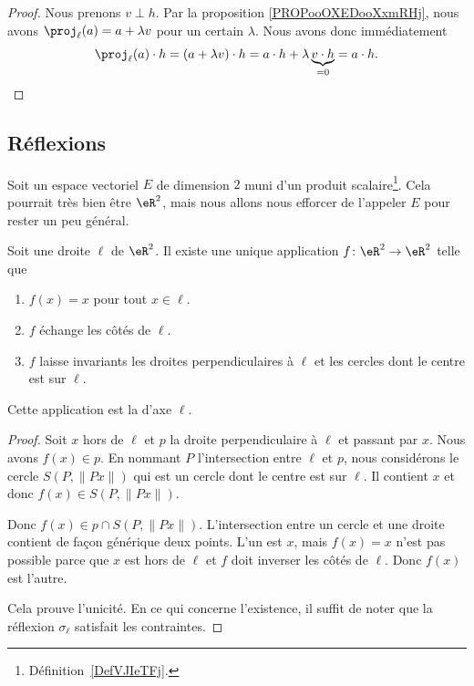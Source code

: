 \begin{proof}
	Nous prenons \( v\perp h\). Par la proposition \ref{PROPooOXEDooXxmRHj}, nous avons \( \proj_{\ell}(a)=a+\lambda v\) pour un certain \( \lambda\). Nous avons donc immédiatement
	\begin{equation}
		\proj_{\ell}(a)\cdot h=(a+\lambda v)\cdot h=a\cdot h+\lambda \underbrace{v\cdot h}_{=0}=a\cdot h.
	\end{equation}
\end{proof}

\subsection{Réflexions}

Soit un espace vectoriel \( E\) de dimension \( 2\) muni d'un produit scalaire\footnote{Définition~\ref{DefVJIeTFj}.}. Cela pourrait très bien être \( \eR^2\), mais nous allons nous efforcer de l'appeler \( E\) pour rester un peu général.

\begin{lemmaDef}        \label{DEFooLJKDooUaamen}
	Soit une droite \( \ell\) de \( \eR^2\). Il existe une unique application \( f\colon \eR^2\to \eR^2\) telle que
	\begin{enumerate}
		\item
		      \( f(x)=x\) pour tout \( x\in \ell\).
		\item
		      \( f\) échange les côtés de \( \ell\).
		\item
		      \( f\) laisse invariants les droites perpendiculaires à \( \ell\) et les cercles dont le centre est sur \( \ell\).
	\end{enumerate}
	Cette application est la  d'axe \( \ell\).
\end{lemmaDef}

\begin{proof}
	Soit \( x\) hors de \( \ell\) et \( p\) la droite perpendiculaire à \( \ell\) et passant par \( x\). Nous avons \( f(x)\in p\). En nommant \( P\) l'intersection entre \( \ell\) et \( p\), nous considérons le cercle \( S(P,\| Px \|)\) qui est un cercle dont le centre est sur \( \ell\). Il contient \( x\) et donc \( f(x)\in S(P,\| Px \|)\).

	Donc \( f(x)\in p\cap S(P,\| Px \|)\). L'intersection entre un cercle et une droite contient de façon générique deux points. L'un est \( x\), mais \( f(x)=x\) n'est pas possible parce que \( x\) est hors de \( \ell\) et \( f\) doit inverser les côtés de \( \ell\). Donc \( f(x)\) est l'autre.

	Cela prouve l'unicité. En ce qui concerne l'existence, il suffit de noter que la réflexion \( \sigma_{\ell}\) satisfait les contraintes.
\end{proof}

